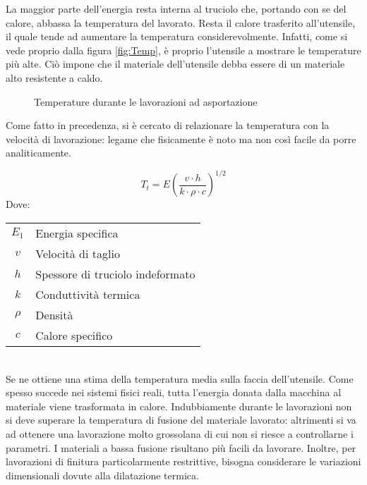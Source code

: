 La maggior parte dell'energia resta interna al truciolo che, portando con se del
calore, abbassa la temperatura del lavorato. Resta il calore trasferito 
all'utensile, il quale tende ad aumentare la temperatura considerevolmente.
Infatti, come si vede proprio dalla figura \ref{fig:Temp}, è proprio
l'utensile a mostrare le temperature più alte. Ciò impone che il
materiale dell'utensile debba essere di un materiale alto resistente a caldo.

\begin{figure}
\centering
{}\quad
{}
\caption{Temperature durante le lavorazioni ad asportazione}
\label{fig:TempLav}
\end{figure}

Come fatto in precedenza, si è cercato di relazionare la temperatura con la
velocità di lavorazione: legame che fisicamente è noto ma non così facile 
da porre analiticamente.

\begin{equation}
T_t = E \left( \frac{v \cdot h}{k \cdot \rho \cdot c}\right)^{1/2}
\end{equation}
Dove:\\
\begin{tabularx}{\textwidth}{cX}
$E_1$ & Energia specifica\\
$v$ & Velocità di taglio\\
$h$ & Spessore di truciolo indeformato\\
$k$ & Conduttività termica\\
$\rho$ & Densità\\
$c$ & Calore specifico 
\end{tabularx}\\
Se ne ottiene una stima della temperatura media sulla faccia dell'utensile.
Come spesso succede nei sistemi fisici reali, tutta l'energia donata dalla
macchina al materiale viene trasformata in calore.
Indubbiamente durante le lavorazioni non si deve superare la temperatura di fusione
del materiale lavorato: altrimenti si va ad ottenere una lavorazione molto grossolana di
cui non si riesce a controllarne i parametri.
I materiali a bassa fusione risultano più facili da lavorare.
Inoltre, per lavorazioni di finitura particolarmente restrittive, bisogna considerare
le variazioni dimensionali dovute alla dilatazione termica.

